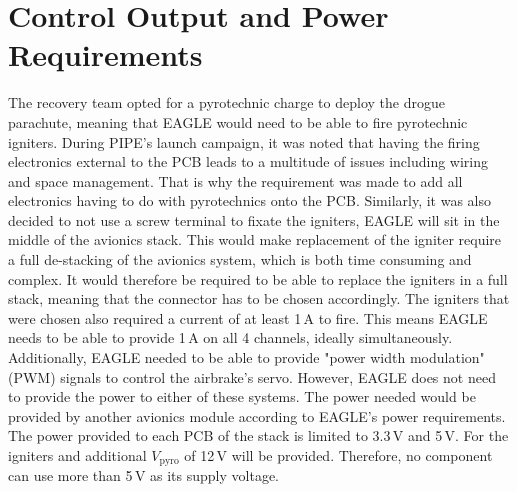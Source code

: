 \documentclass[fontsize=11pt,%
twoside,%
BCOR          = 8mm, %
DIV           = 11,  %
titlepage     = off,%
index=totoc,%
xcolor        = pdftex,%
dvipsnames,%
bibliography  = totoc,%
bibliography = numbered, %
listof        = notnumbered]{scrreprt}
\begin{document}
\section{Control Output and Power Requirements}
The recovery team opted for a pyrotechnic charge to deploy the drogue parachute, meaning that EAGLE would need to be able to fire pyrotechnic igniters. During PIPE's launch campaign, it was noted that having the firing electronics external to the PCB leads to a multitude of issues including wiring and space management. That is why the requirement was made to add all electronics having to do with pyrotechnics onto the PCB. Similarly, it was also decided to not use a screw terminal to fixate the igniters, EAGLE will sit in the middle of the avionics stack. This would make replacement of the igniter require a full de-stacking of the avionics system, which is both time consuming and complex. It would therefore be required to be able to replace the igniters in a full stack, meaning that the connector has to be chosen accordingly. The igniters that were chosen also required a current of at least 1\,A to fire. This means EAGLE needs to be able to provide 1\,A on all 4 channels, ideally simultaneously.\\
Additionally, EAGLE needed to be able to provide "power width modulation" (PWM) signals to control the airbrake's servo. However, EAGLE does not need to provide the power to either of these systems. The power needed would be provided by another avionics module according to EAGLE's power requirements. The power provided to each PCB of the stack is limited to 3.3\,V and 5\,V. For the igniters and additional $V_\text{pyro}$ of 12\,V will be provided. Therefore, no component can use more than 5\,V as its supply voltage.
\end{document}
